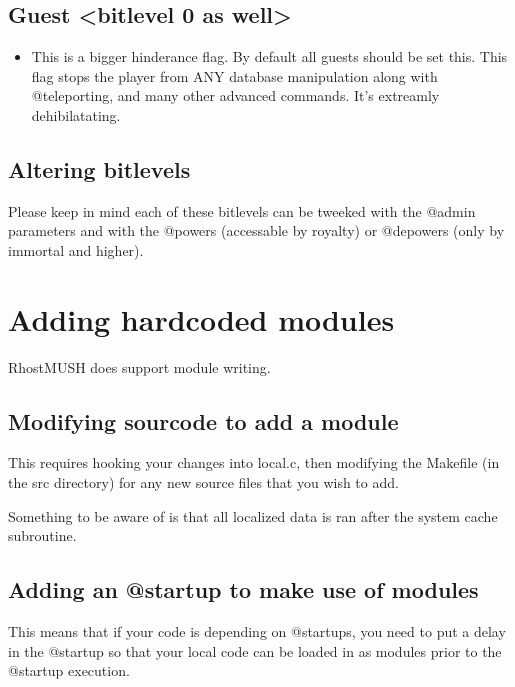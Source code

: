 \documentclass[letterpaper,10pt,english]{sphinxmanual}
\begin{document}
\section{Guest \textless{}bitlevel 0 as well\textgreater{}}
\label{\detokenize{15-bitlevels:guest-bitlevel-0-as-well}}\begin{itemize}
\item {} 
\sphinxAtStartPar
This is a bigger hinderance flag.  By default all guests should be
set this.  This flag stops the player from ANY database manipulation
along with @teleporting, and many other advanced commands.  It’s
extreamly dehibilatating.

\end{itemize}


\section{Altering bitlevels}
\label{\detokenize{15-bitlevels:altering-bitlevels}}
\sphinxAtStartPar
Please keep in mind each of these bitlevels can be tweeked with the @admin
parameters and with the @powers (accessable by royalty) or @depowers (only
by immortal and higher).


\chapter{Adding hardcoded modules}
\label{\detokenize{16-modules:adding-hardcoded-modules}}\label{\detokenize{16-modules::doc}}
\sphinxAtStartPar
RhostMUSH does support module writing.


\section{Modifying sourcode to add a module}
\label{\detokenize{16-modules:modifying-sourcode-to-add-a-module}}
\sphinxAtStartPar
This requires hooking your changes into local.c, then modifying the Makefile (in the src directory)
for any new source files that you wish to add.

\sphinxAtStartPar
Something to be aware of is that all localized data is ran after the system cache subroutine.


\section{Adding an @startup to make use of modules}
\label{\detokenize{16-modules:adding-an-startup-to-make-use-of-modules}}
\sphinxAtStartPar
This means that if your code is depending on @startups, you need to put a delay in the @startup
so that your local code can be loaded in as modules prior to the @startup execution.
\end{document}
